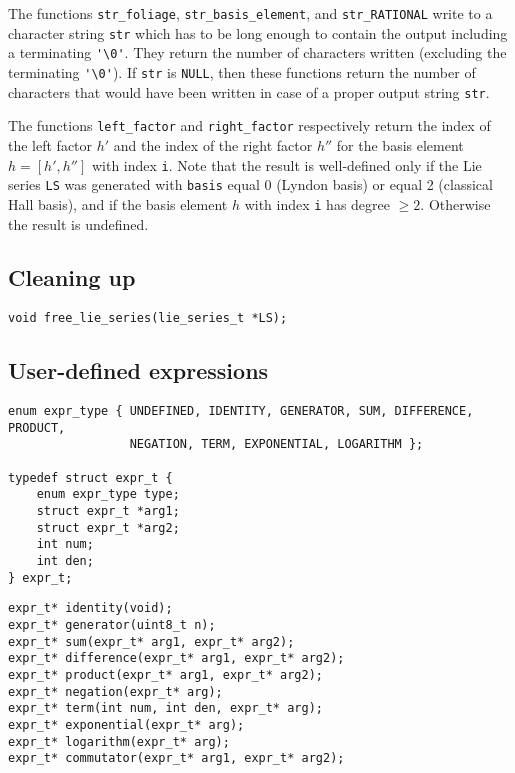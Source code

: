 \documentclass[11pt,a4paper]{article}
\begin{document}
The functions \verb|str_foliage|, \verb|str_basis_element|, and \verb|str_RATIONAL| write
to a character string \verb|str| which has to be long enough 
to contain the output including a terminating \verb|'\0'|.
They return the number of characters written (excluding the terminating \verb|'\0'|).
If \verb|str| is \verb|NULL|, then these functions return the number
of characters that would have been written in case of a proper output
string \verb|str|.

The functions \verb|left_factor| and \verb|right_factor|
respectively
return the index of the left factor $h'$ and the index of the right
factor $h''$ for the basis element $h=[h',h'']$ with index \verb|i|.
Note that the result is well-defined only if the Lie series \verb|LS| 
was generated with  \verb|basis| equal 0 (Lyndon basis) or 
equal 2 (classical Hall basis),
and if the basis element $h$ with index \verb|i| has degree $\geq 2$.
Otherwise the result is undefined.

\subsection{Cleaning up}
\begin{verbatim}
void free_lie_series(lie_series_t *LS);
\end{verbatim}


\subsection{User-defined expressions}\label{SubSec:UserDefExpr}

\begin{verbatim}
enum expr_type { UNDEFINED, IDENTITY, GENERATOR, SUM, DIFFERENCE, PRODUCT, 
                 NEGATION, TERM, EXPONENTIAL, LOGARITHM };

typedef struct expr_t {
    enum expr_type type;
    struct expr_t *arg1;
    struct expr_t *arg2;
    int num;
    int den;
} expr_t;
\end{verbatim}

\begin{verbatim}
expr_t* identity(void);
expr_t* generator(uint8_t n);
expr_t* sum(expr_t* arg1, expr_t* arg2);
expr_t* difference(expr_t* arg1, expr_t* arg2);
expr_t* product(expr_t* arg1, expr_t* arg2);
expr_t* negation(expr_t* arg);
expr_t* term(int num, int den, expr_t* arg);
expr_t* exponential(expr_t* arg);
expr_t* logarithm(expr_t* arg);
expr_t* commutator(expr_t* arg1, expr_t* arg2);
\end{verbatim}
\end{document}
